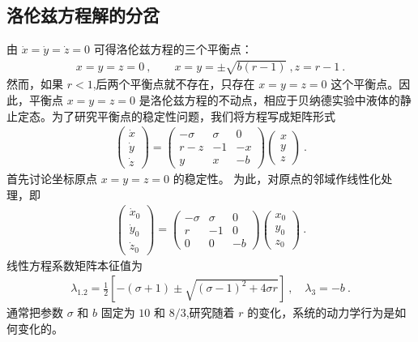 \subsection{洛伦兹方程解的分岔}

由 $\dot{x}=\dot{y}=\dot{z}=0$ 可得洛伦兹方程的三个平衡点：
\begin{align}
x=y=z=0~,\qquad x=y=\pm\sqrt{b(r-1)}~, z=r-1~.
\end{align}
然而，如果 $r<1$,后两个平衡点就不存在，只存在 $x=y=z=0$ 这个平衡点。因此，平衡点 $x=y=z=0$ 是洛伦兹方程的不动点，相应于贝纳德实验中液体的静止定态。为了研究平衡点的稳定性问题，我们将方程写成矩阵形式
\begin{align}
\left(\begin{array}{l}
\dot{x} \\
\dot{y} \\
\dot{z}
\end{array}\right)=\left(\begin{array}{ccc}
-\sigma & \sigma & 0 \\
r-z & -1 & -x \\
y & x & -b
\end{array}\right)\left(\begin{array}{l}
x \\
y \\
z
\end{array}\right)~.
\end{align}
首先讨论坐标原点 $x=y=z=0$ 的稳定性。 为此，对原点的邻域作线性化处理，即
\begin{align}
\left(\begin{array}{l}
\dot{x}_{0} \\
\dot{y}_{0} \\
\dot{z}_{0}
\end{array}\right)=\left(\begin{array}{ccc}
-\sigma & \sigma & 0 \\
r & -1 & 0 \\
0 & 0 & -b
\end{array}\right)\left(\begin{array}{l}
x_{0} \\
y_{0} \\
z_{0}
\end{array}\right)~.
\end{align}
线性方程系数矩阵本征值为
\begin{align}
\lambda_{1.2}=\frac{1}{2}\left[-(\sigma+1) \pm \sqrt{(\sigma-1)^{2}+4 \sigma r}\right]~, \quad \lambda_{3}=-b~.
\end{align}
通常把参数 $\sigma$ 和 $b$ 固定为 $10$ 和 $8/3$,研究随着 $r$ 的变化，系统的动力学行为是如何变化的。

